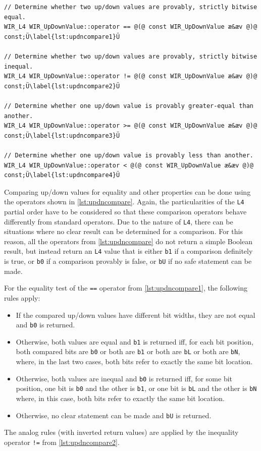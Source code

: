 \begin{lstlisting}[style=code,float=!t,caption={Comparison Operators of Class \texttt{WIR\_UpDownValue}},label=lst:updncompare]
// Determine whether two up/down values are provably, strictly bitwise equal.
WIR_L4 WIR_UpDownValue::operator == @(@ const WIR_UpDownValue æ&æv @)@ const;Ü\label{lst:updncompare1}Ü

// Determine whether two up/down values are provably, strictly bitwise inequal.
WIR_L4 WIR_UpDownValue::operator != @(@ const WIR_UpDownValue æ&æv @)@ const;Ü\label{lst:updncompare2}Ü

// Determine whether one up/down value is provably greater-equal than another.
WIR_L4 WIR_UpDownValue::operator >= @(@ const WIR_UpDownValue æ&æv @)@ const;Ü\label{lst:updncompare3}Ü

// Determine whether one up/down value is provably less than another.
WIR_L4 WIR_UpDownValue::operator < @(@ const WIR_UpDownValue æ&æv @)@ const;Ü\label{lst:updncompare4}Ü
\end{lstlisting}

Comparing up/down values for equality and other properties can be done using the operators shown in \cref{lst:updncompare}.
Again, the particularities of the \texttt{L4} partial order have to be considered so that these comparison operators behave differently from standard operators.
Due to the nature of \texttt{L4}, there can be situations where no clear result can be determined for a comparison.
For this reason, all the operators from \cref{lst:updncompare} do not return a simple Boolean result, but instead return an \texttt{L4} value that is either \texttt{b1} if a comparison definitely is true, or \texttt{b0} if a comparison provably is false, or \texttt{bU} if no safe statement can be made.

For the equality test of the \texttt{==} operator from \cref{lst:updncompare1}, the following rules apply:
\begin{itemize}
  \item If the compared up/down values have different bit widths, they are not equal and \texttt{b0} is returned.
  \item Otherwise, both values are equal and \texttt{b1} is returned iff, for each bit position, both compared bits are \texttt{b0} or both are \texttt{b1} or both are \texttt{bL} or both are \texttt{bN}, where, in the last two cases, both bits refer to exactly the same bit location.
  \item Otherwise, both values are inequal and \texttt{b0} is returned iff, for some bit position, one bit is \texttt{b0} and the other is \texttt{b1}, or one bit is \texttt{bL} and the other is \texttt{bN} where, in this case, both bits refer to exactly the same bit location.
  \item Otherwise, no clear statement can be made and \texttt{bU} is returned.
\end{itemize}
The analog rules (with inverted return values) are applied by the inequality operator \texttt{!=} from \cref{lst:updncompare2}.

